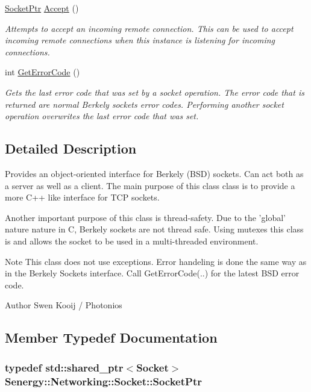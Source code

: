 \begin{DoxyCompactItemize}
\hyperlink{class_senergy_1_1_networking_1_1_socket_a19cb724ef153aebdbcc66cd4c3c4952a}{Socket\-Ptr} \hyperlink{class_senergy_1_1_networking_1_1_socket_a7796c8d13c593c99384a4ba7b54a2756}{Accept} ()
\begin{DoxyCompactList}\small\item\em Attempts to accept an incoming remote connection. This can be used to accept incoming remote connections when this instance is listening for incoming connections. \end{DoxyCompactList}\item 
int \hyperlink{class_senergy_1_1_networking_1_1_socket_af41c4b3448f3f7aff3dcc3b3580b6c1a}{Get\-Error\-Code} ()
\begin{DoxyCompactList}\small\item\em Gets the last error code that was set by a socket operation. The error code that is returned are normal Berkely sockets error codes. Performing another socket operation overwrites the last error code that was set. \end{DoxyCompactList}\end{DoxyCompactItemize}


\subsection{Detailed Description}
Provides an object-\/oriented interface for Berkely (B\-S\-D) sockets. Can act both as a server as well as a client. The main purpose of this class class is to provide a more C++ like interface for T\-C\-P sockets. 

Another important purpose of this class is thread-\/safety. Due to the 'global' nature nature in C, Berkely sockets are not thread safe. Using mutexes this class is and allows the socket to be used in a multi-\/threaded environment.

\begin{DoxyNote}{Note}
This class does not use exceptions. Error handeling is done the same way as in the Berkely Sockets interface. Call Get\-Error\-Code(..) for the latest B\-S\-D error code.
\end{DoxyNote}
\begin{DoxyAuthor}{Author}
Swen Kooij / Photonios 
\end{DoxyAuthor}


\subsection{Member Typedef Documentation}
\hypertarget{class_senergy_1_1_networking_1_1_socket_a19cb724ef153aebdbcc66cd4c3c4952a}{
\subsubsection[{Socket\-Ptr}]{\setlength{\rightskip}{0pt plus 5cm}typedef std\-::shared\-\_\-ptr$<${\bf Socket}$>$ {\bf Senergy\-::\-Networking\-::\-Socket\-::\-Socket\-Ptr}}}\label{class_senergy_1_1_networking_1_1_socket_a19cb724ef153aebdbcc66cd4c3c4952a}


